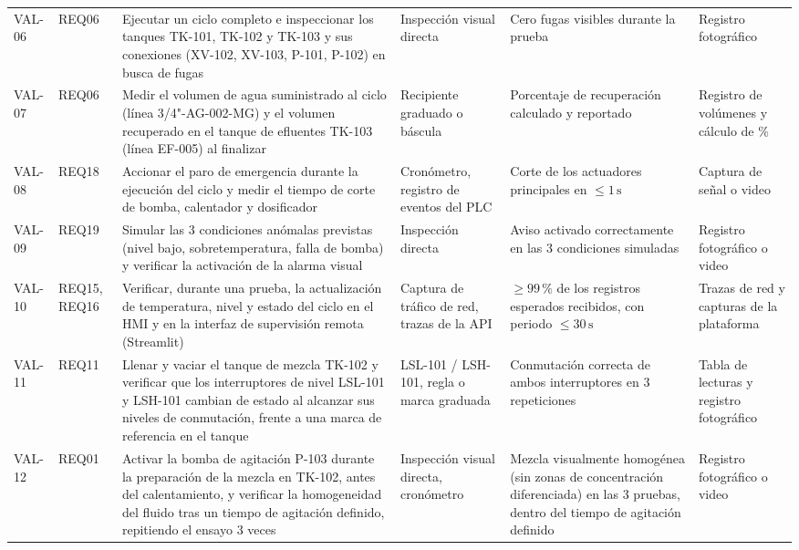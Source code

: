 \begin{longtable}{p{1.3cm} p{1.4cm} p{4.3cm} p{2.6cm} p{3.4cm} p{2.4cm}}
VAL-06 & REQ06 & Ejecutar un ciclo completo e inspeccionar los tanques TK-101, TK-102 y TK-103 y sus conexiones (XV-102, XV-103, P-101, P-102) en busca de fugas & Inspección visual directa & Cero fugas visibles durante la prueba & Registro fotográfico \\

VAL-07 & REQ06 & Medir el volumen de agua suministrado al ciclo (línea 3/4"-AG-002-MG) y el volumen recuperado en el tanque de efluentes TK-103 (línea EF-005) al finalizar & Recipiente graduado o báscula & Porcentaje de recuperación calculado y reportado & Registro de volúmenes y cálculo de \% \\

VAL-08 & REQ18 & Accionar el paro de emergencia durante la ejecución del ciclo y medir el tiempo de corte de bomba, calentador y dosificador & Cronómetro, registro de eventos del PLC & Corte de los actuadores principales en $\leq 1\,\text{s}$ & Captura de señal o video \\

VAL-09 & REQ19 & Simular las 3 condiciones anómalas previstas (nivel bajo, sobretemperatura, falla de bomba) y verificar la activación de la alarma visual & Inspección directa & Aviso activado correctamente en las 3 condiciones simuladas & Registro fotográfico o video \\

VAL-10 & REQ15, REQ16 & Verificar, durante una prueba, la actualización de temperatura, nivel y estado del ciclo en el HMI y en la interfaz de supervisión remota (Streamlit) & Captura de tráfico de red, trazas de la API & $\geq 99\,\%$ de los registros esperados recibidos, con periodo $\leq 30\,\text{s}$ & Trazas de red y capturas de la plataforma \\

VAL-11 & REQ11 & Llenar y vaciar el tanque de mezcla TK-102 y verificar que los interruptores de nivel LSL-101 y LSH-101 cambian de estado al alcanzar sus niveles de conmutación, frente a una marca de referencia en el tanque & LSL-101 / LSH-101, regla o marca graduada & Conmutación correcta de ambos interruptores en 3 repeticiones & Tabla de lecturas y registro fotográfico \\

VAL-12 & REQ01 & Activar la bomba de agitación P-103 durante la preparación de la mezcla en TK-102, antes del calentamiento, y verificar la homogeneidad del fluido tras un tiempo de agitación definido, repitiendo el ensayo 3 veces & Inspección visual directa, cronómetro & Mezcla visualmente homogénea (sin zonas de concentración diferenciada) en las 3 pruebas, dentro del tiempo de agitación definido & Registro fotográfico o video \\


\end{longtable}
